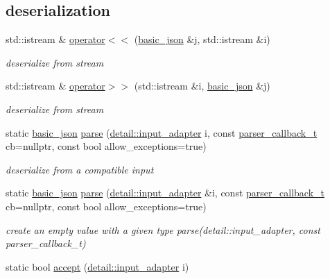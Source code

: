 \subsection*{deserialization}
\begin{DoxyCompactItemize}
\item 
std\+::istream \& \hyperlink{classnlohmann_1_1basic__json_a60ca396028b8d9714c6e10efbf475af6}{operator$<$$<$} (\hyperlink{classnlohmann_1_1basic__json}{basic\+\_\+json} \&j, std\+::istream \&i)
\begin{DoxyCompactList}\small\item\em deserialize from stream \end{DoxyCompactList}\item 
std\+::istream \& \hyperlink{classnlohmann_1_1basic__json_aaf363408931d76472ded14017e59c9e8}{operator$>$$>$} (std\+::istream \&i, \hyperlink{classnlohmann_1_1basic__json}{basic\+\_\+json} \&j)
\begin{DoxyCompactList}\small\item\em deserialize from stream \end{DoxyCompactList}\item 
static \hyperlink{classnlohmann_1_1basic__json}{basic\+\_\+json} \hyperlink{classnlohmann_1_1basic__json_aa9676414f2e36383c4b181fe856aa3c0}{parse} (\hyperlink{classnlohmann_1_1detail_1_1input__adapter}{detail\+::input\+\_\+adapter} i, const \hyperlink{classnlohmann_1_1basic__json_ab4f78c5f9fd25172eeec84482e03f5b7}{parser\+\_\+callback\+\_\+t} cb=nullptr, const bool allow\+\_\+exceptions=true)
\begin{DoxyCompactList}\small\item\em deserialize from a compatible input \end{DoxyCompactList}\item 
static \hyperlink{classnlohmann_1_1basic__json}{basic\+\_\+json} \hyperlink{classnlohmann_1_1basic__json_af3501e04d3c7a824bffb05a5a45ba884}{parse} (\hyperlink{classnlohmann_1_1detail_1_1input__adapter}{detail\+::input\+\_\+adapter} \&i, const \hyperlink{classnlohmann_1_1basic__json_ab4f78c5f9fd25172eeec84482e03f5b7}{parser\+\_\+callback\+\_\+t} cb=nullptr, const bool allow\+\_\+exceptions=true)
\begin{DoxyCompactList}\small\item\em create an empty value with a given type parse(detail\+::input\+\_\+adapter, const parser\+\_\+callback\+\_\+t) \end{DoxyCompactList}\item 
static bool \hyperlink{classnlohmann_1_1basic__json_a776868dd5f9892564c1f6c786d1f80a3}{accept} (\hyperlink{classnlohmann_1_1detail_1_1input__adapter}{detail\+::input\+\_\+adapter} i)

\end{DoxyCompactItemize}
